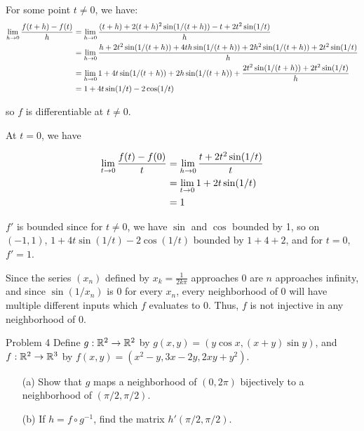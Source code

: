 \documentclass{hmwk}
\begin{document}
\begin{solution}

\pre For some point $t \neq 0$, we have:
\begin{align*}
    \lim_{h \rightarrow 0}\frac{f(t + h) - f(t)}{h} &= \lim_{h \rightarrow 0}\frac{(t+h) + 2(t+h)^2\sin(1/(t+h)) - t + 2t^2\sin(1/t)}{h} \\
    &= \lim_{h \rightarrow 0}\frac{h + 2t^2\sin(1/(t+h)) + 4th\sin(1/(t+h)) + 2h^2\sin(1/(t+h)) + 2t^2\sin(1/t)}{h} \\
    &= \lim_{h \rightarrow 0}1 + 4t\sin(1/(t+h)) + 2h\sin(1/(t+h)) + \frac{2t^2\sin(1/(t+h)) + 2t^2\sin(1/t)}{h} \\
    &= 1 + 4t\sin(1/t) - 2\cos(1/t)
\end{align*}

\pre so $f$ is differentiable at $t \neq 0$.

\pre At $t = 0$, we have

\begin{align*}
    \lim_{t \rightarrow 0}\frac{f(t) - f(0)}{t} &= \lim_{h \rightarrow 0}\frac{t+2t^2\sin(1/t)}{t} \\
    &= \lim_{t \rightarrow 0}1 + 2t\sin(1/t) \\
    &= 1
\end{align*}

\pre $f'$ is bounded since for $t \neq 0$, we have $\sin$ and $\cos$ bounded by 1, so on $(-1, 1)$, $1 + 4t\sin(1/t) - 2\cos(1/t)$ bounded by $1 + 4 + 2$, and for $t = 0$, $f' = 1$.

\pre Since the series $(x_n)$ defined by $x_k = \frac{1}{2k\pi}$ approaches 0 are $n$ approaches infinity, and since $\sin(1/x_n)$ is $0$ for every $x_n$, every neighborhood of 0 will have multiple different inputs which $f$ evaluates to 0. Thus, $f$ is not injective in any neighborhood of 0.

\end{solution}

\begin{problem}{Problem 4}
Define $g: \mathbb{R}^2 \rightarrow \mathbb{R}^2$ by $g(x,y) = (y\cos x, (x + y)\sin y)$, and $f: \mathbb{R}^2 \rightarrow \mathbb{R}^3$ by $f(x, y) = (x^2 - y, 3x - 2y, 2xy + y^2)$.
\begin{itemize}
    \item[(a)] Show that $g$ maps a neighborhood of $(0, 2\pi)$ bijectively to a neighborhood of $(\pi/2, \pi/2)$.
    \item[(b)] If $h = f \circ g^{-1}$, find the matrix $h'(\pi/2, \pi/2)$.
\end{itemize}
\end{problem}
\end{document}
